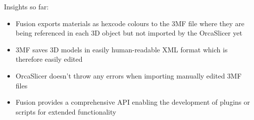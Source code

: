 Insights so far: 
\begin{itemize}
    \item Fusion exports materials as hexcode colours to the 3MF file where they are being referenced in each 3D object but not imported by the OrcaSlicer yet
    \item 3MF saves 3D models in easily human-readable XML format which is therefore easily edited 
    \item OrcaSlicer doesn't throw any errors when importing manually edited 3MF files 
    \item Fusion provides a comprehensive API enabling the development of plugins or scripts for extended functionality 
\end{itemize}
